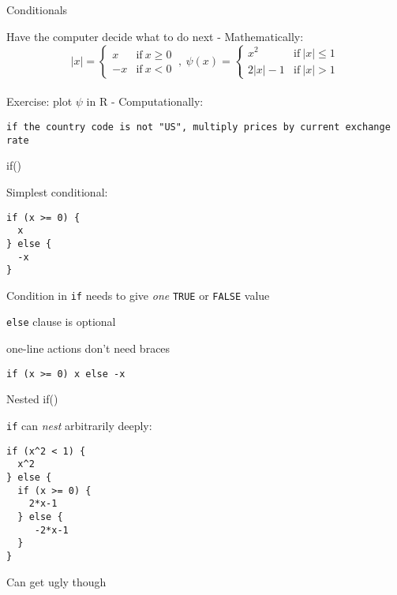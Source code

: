 \documentclass[8pt,ignorenonframetext,]{beamer}
\begin{document}
\begin{frame}[fragile]{Conditionals}

Have the computer decide what to do next - Mathematically: \[
|x| = \left\{ \begin{array}{cl} x & \mathrm{if}~x\geq 0 \\
-x &\mathrm{if}~ x < 0\end{array}\right. ~,~ 
\psi(x) = \left\{ \begin{array}{cl} x^2 & \mathrm{if}~|x|\leq 1\\
2|x|-1 &\mathrm{if}~ |x| > 1\end{array}\right.
\]\\
Exercise: plot \(\psi\) in R - Computationally:

\begin{verbatim}
if the country code is not "US", multiply prices by current exchange rate
\end{verbatim}

\end{frame}

\begin{frame}[fragile]{if()}

Simplest conditional:

\begin{verbatim}
if (x >= 0) {
  x
} else {
  -x
}
\end{verbatim}

Condition in \texttt{if} needs to give \emph{one} \texttt{TRUE} or
\texttt{FALSE} value

\texttt{else} clause is optional

one-line actions don't need braces

\begin{verbatim}
if (x >= 0) x else -x
\end{verbatim}

\end{frame}

\begin{frame}[fragile]{Nested if()}

\texttt{if} can \emph{nest} arbitrarily deeply:

\begin{verbatim}
if (x^2 < 1) {
  x^2
} else {
  if (x >= 0) {
    2*x-1
  } else {
     -2*x-1
  }
}
\end{verbatim}

Can get ugly though

\end{frame}
\end{document}
